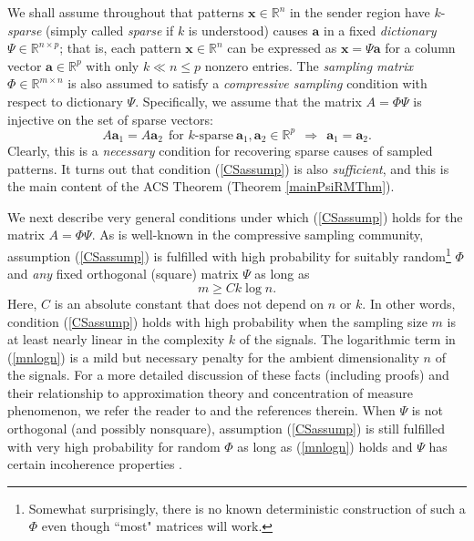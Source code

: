 \documentclass[11pt]{amsart}
\begin{document}
We shall assume throughout that patterns $\mathbf{x} \in \mathbb R^n$ in the sender region have $k$-\textit{sparse} (simply called \textit{sparse} if $k$ is understood) causes $\mathbf{a}$ in a fixed %
\textit{dictionary} $\Psi \in \mathbb R^{n \times p}$; that is, each pattern $\mathbf{x} \in \mathbb R^n$ can be expressed as $\mathbf{x} = \Psi \mathbf{a}$ for a column vector $\mathbf{a} \in \mathbb R^p$ with only $k \ll n \leq p$ nonzero entries.  The %
\textit{sampling  matrix} $\Phi \in \mathbb R^{m \times n}$ is also assumed to satisfy a \textit{compressive sampling} condition with respect to dictionary  $\Psi$.  Specifically, we assume that the matrix $A = \Phi \Psi$ is injective on the set of sparse vectors:
\begin{equation}\label{CSassump}
A \mathbf{a}_1 = A \mathbf{a}_2  \ \ \text{for $k$-sparse}  \ \mathbf{a}_1,\mathbf{a}_2 \in \mathbb R^p \ \   \Longrightarrow \  \  \mathbf{a}_1 =  \mathbf{a}_2.
\end{equation}
Clearly, this is a \textit{necessary} condition for recovering sparse causes of sampled patterns.  It turns out that condition (\ref{CSassump}) is also \textit{sufficient}, and this is the main content of the ACS Theorem (Theorem \ref{mainPsiRMThm}).  

We next describe very general conditions under which (\ref{CSassump}) holds for the matrix $A = \Phi \Psi$.  As is well-known in the compressive sampling community, assumption (\ref{CSassump}) is fulfilled with high probability for suitably random\footnote{Somewhat surprisingly, there is no known deterministic construction of such a $\Phi$ even though ``most" matrices will work.} $\Phi $ and \textit{any} fixed orthogonal (square) matrix $\Psi$ as long as 
\begin{equation}\label{mnlogn}
m \geq C k \log n.  
\end{equation}
Here, $C$ is an absolute constant that does not depend on $n$ or $k$.  In other words,  condition (\ref{CSassump}) holds with high probability when the sampling size $m$ is at least nearly linear in the complexity $k$ of the signals.  The logarithmic term in (\ref{mnlogn}) is a mild but necessary penalty for the ambient dimensionality $n$ of the signals.
For a more detailed discussion of these facts (including proofs) and their relationship to approximation theory and concentration of measure phenomenon, we refer the reader to \cite{Baraniuk2008} and the references therein.  When $\Psi$ is not orthogonal (and possibly nonsquare), assumption (\ref{CSassump}) is still fulfilled with very high probability for random $\Phi$ as long as (\ref{mnlogn}) holds and $\Psi$ has certain incoherence properties \cite{BiRiTsy08, RasWaiYu09}.
\end{document}
